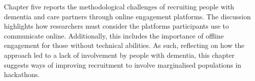 \begin{itemize}
    Chapter five reports the methodological challenges of recruiting people with dementia and care partners through online engagement platforms. The discussion highlights how researchers must consider the platforms participants use to communicate online. Additionally, this includes the importance of offline engagement for those without technical abilities. As such, reflecting on how the approach led to a lack of involvement by people with dementia, this chapter suggests ways of improving recruitment to involve marginalised populations in hackathons.
\end{itemize}

